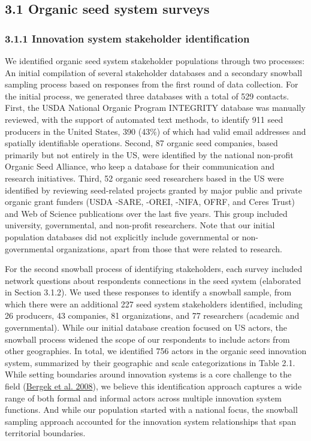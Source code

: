 \documentclass[twoside,12pt,final]{ucthesis-CA2012}
\begin{document}
\begin{ucmainmatter}
\hypertarget{organic-seed-system-surveys}{%
\subsection{3.1 Organic seed system surveys}\label{organic-seed-system-surveys}}

\hypertarget{innovation-system-stakeholder-identification}{%
\subsubsection{3.1.1 Innovation system stakeholder identification}\label{innovation-system-stakeholder-identification}}

We identified organic seed system stakeholder populations through two
processes: An initial compilation of several stakeholder databases and a
secondary snowball sampling process based on responses from the first
round of data collection. For the initial process, we generated three
databases with a total of 529 contacts. First, the USDA National Organic
Program INTEGRITY database was manually reviewed, with the support of
automated text methods, to identify 911 seed producers in the United
States, 390 (43\%) of which had valid email addresses and spatially
identifiable operations. Second, 87 organic seed companies, based
primarily but not entirely in the US, were identified by the national
non-profit Organic Seed Alliance, who keep a database for their
communication and research initiatives. Third, 52 organic seed
researchers based in the US were identified by reviewing seed-related
projects granted by major public and private organic grant funders (USDA
-SARE, -OREI, -NIFA, OFRF, and Ceres Trust) and Web of Science
publications over the last five years. This group included university,
governmental, and non-profit researchers. Note that our initial
population databases did not explicitly include governmental or
non-governmental organizations, apart from those that were related to
research.

For the second snowball process of identifying stakeholders, each survey
included network questions about respondents\textquotesingle{} connections in the seed
system (elaborated in Section 3.1.2). We used these responses to
identify a snowball sample, from which there were an additional 227 seed
system stakeholders identified, including 26 producers, 43 companies, 81
organizations, and 77 researchers (academic and governmental). While our
initial database creation focused on US actors, the snowball process
widened the scope of our respondents to include actors from other
geographies. In total, we identified 756 actors in the organic seed
innovation system, summarized by their geographic and scale
categorizations in Table 2.1. While setting boundaries around innovation
systems is a core challenge to the field
(\protect\hyperlink{ref-Bergek_Jacobsson_Carlsson_Lindmark_Rickne_2008}{Bergek et al. 2008}),
we believe this identification approach captures a wide range of both
formal and informal actors across multiple innovation system functions.
And while our population started with a national focus, the snowball
sampling approach accounted for the innovation system relationships that
span territorial boundaries.


\end{ucmainmatter}
\end{document}
